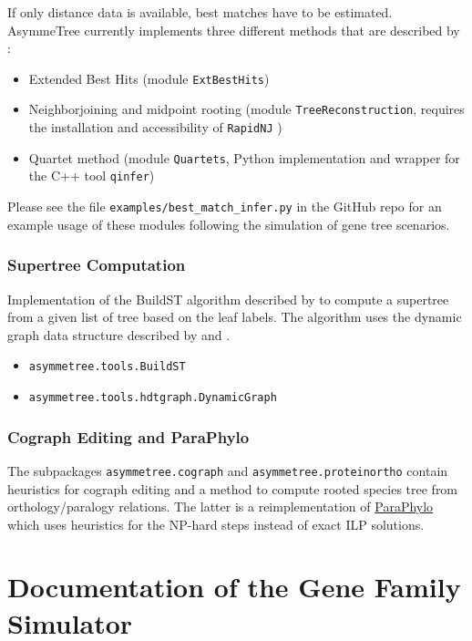 \documentclass[hidelinks,11pt]{scrreprt}
\begin{document}
If only distance data is available, best matches have to be estimated.
AsymmeTree currently implements three different methods that are described by \citet{stadler2020}:
\begin{itemize}
	\item Extended Best Hits (module \texttt{ExtBestHits})
	\item Neighborjoining and midpoint rooting (module \texttt{TreeReconstruction}, requires the installation and accessibility of \texttt{RapidNJ} \citep{simonsen2008})
	\item Quartet method (module \texttt{Quartets}, Python implementation and wrapper for the C++ tool \texttt{qinfer})
\end{itemize}

Please see the file \texttt{examples/best\_match\_infer.py} in the GitHub repo for an example usage of these modules following the simulation of gene tree scenarios.



\subsection{Supertree Computation}

Implementation of the BuildST algorithm described by \citet{deng2016} to compute a supertree from a given list of tree based on the leaf labels. The algorithm uses the dynamic graph data structure described by \citet{henzinger1995} and \citet{holm2001}.
\begin{itemize}
	\item \texttt{asymmetree.tools.BuildST}
	\item \texttt{asymmetree.tools.hdtgraph.DynamicGraph}
\end{itemize}


\subsection{Cograph Editing and ParaPhylo}

The subpackages \texttt{asymmetree.cograph} and \texttt{asymmetree.proteinortho} contain heuristics for cograph editing and a method to compute rooted species tree from orthology/paralogy relations.
The latter is a reimplementation of \href{http://pacosy.informatik.uni-leipzig.de/208-0-ParaPhylo.html}{ParaPhylo} \citep{hellmuth2015} which uses heuristics for the NP-hard steps instead of exact ILP solutions.




\chapter{Documentation of the Gene Family Simulator}\label{sec:doc}
\end{document}
